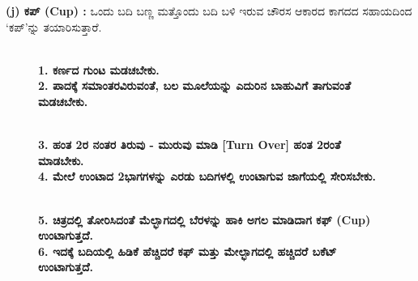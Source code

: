 \noindent
\textbf{(j) ಕಪ್ (Cup) :} ಒಂದು ಬದಿ ಬಣ್ಣ ಮತ್ತೊಂದು ಬದಿ ಬಳಿ ಇರುವ ಚೌರಸ ಆಕಾರದ ಕಾಗದದ ಸಹಾಯದಿಂದ `ಕಪ್'ನ್ನು ತಯಾರಿಸುತ್ತಾರೆ.
\begin{figure}[H]
\\
\textbf{1. ಕರ್ಣದ ಗುಂಟ ಮಡಚಬೇಕು.}\\
\textbf{2. ಪಾದಕ್ಕೆ ಸಮಾಂತರವಿರುವಂತೆ, ಬಲ ಮೂಲೆಯನ್ನು ಎದುರಿನ ಬಾಹುವಿಗೆ ತಾಗುವಂತೆ ಮಡಚಬೇಕು.}
\end{figure}
\begin{figure}[H]
\\
\textbf{3. ಹಂತ 2ರ ನಂತರ ತಿರುವು - ಮುರುವು ಮಾಡಿ [Turn Over] ಹಂತ 2ರಂತೆ ಮಾಡಬೇಕು.}\\
\textbf{4. ಮೇಲೆ ಉಂಟಾದ 2ಭಾಗಗಳನ್ನು ಎರಡು ಬದಿಗಳಲ್ಲಿ ಉಂಟಾಗುವ ಜಾಗೆಯಲ್ಲಿ ಸೇರಿಸಬೇಕು.}
\end{figure}
\begin{figure}[H]
\\
\textbf{5. ಚಿತ್ರದಲ್ಲಿ ತೋರಿಸಿದಂತೆ ಮೆಲ್ಭಾಗದಲ್ಲಿ ಬೆರಳನ್ನು ಹಾಕಿ ಅಗಲ ಮಾಡಿದಾಗ ಕಫ್ (Cup) ಉಂಟಾಗುತ್ತದೆ.}\\
\textbf{6. ಇದಕ್ಕೆ ಬದಿಯಲ್ಲಿ ಹಿಡಿಕೆ ಹೆಚ್ಚಿದರೆ ಕಫ್ ಮತ್ತು ಮೇಲ್ಭಾಗದಲ್ಲಿ ಹಚ್ಚಿದರೆ ಬಕೆಟ್ ಉಂಟಾಗುತ್ತದೆ.}
\end{figure}

